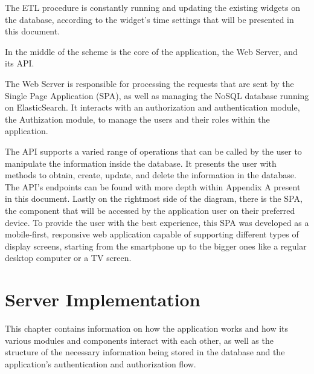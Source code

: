 \documentclass[a4paper,twoside,10pt]{report}
\begin{document}
The ETL procedure is constantly running and updating the existing widgets on the database, according to the widget's time settings that will be presented in this document.

In the middle of the scheme is the core of the application, the Web Server, and its API.

The Web Server is responsible for processing the requests that are sent by the Single Page Application (SPA), as well as managing the NoSQL database running on ElasticSearch\cite{ES}.
It interacts with an authorization and authentication module, the Authization module, to manage the users and their roles within the application.

The API supports a varied range of operations that can be called by the user to manipulate the information inside the database. It presents the user with methods to obtain, create, update, and delete the information in the database.
The API's endpoints can be found with more depth within Appendix A present in this document.
Lastly on the rightmost side of the diagram, there is the SPA, the component that will be accessed by the application user on their preferred device. To provide the user with the best experience, this SPA was developed as a mobile-first, responsive web application capable of supporting different types of display screens, starting from the smartphone up to the bigger ones like a regular desktop computer or a TV screen.

\chapter{Server Implementation}
This chapter contains information on how the application works and how its various modules and components interact with each other, as well as the structure of the necessary information being stored in the database and the application's authentication and authorization flow.
\end{document}
